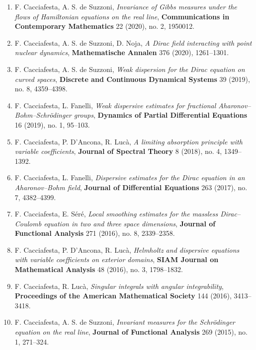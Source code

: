 \documentclass[10pt,a4paper]{article}
\newcommand{\venue}[1]{\textbf{#1}}
\newcommand{\FC}{{F. Cacciafesta}}
\begin{document}
\begin{enumerate}[label=\arabic*.,wide=0pt]
\item \FC, A. S. de Suzzoni, \emph{Invariance of Gibbs measures under the flows of Hamiltonian equations on the real line}, \venue{Communications in Contemporary Mathematics} 22 (2020), no. 2, 1950012.

\item \FC, A. S. de Suzzoni, D. Noja, \emph{A Dirac field interacting with point nuclear dynamics}, \venue{Mathematische Annalen} 376 (2020), 1261--1301.

\item \FC, A. S. de Suzzoni, \emph{Weak dispersion for the Dirac equation on curved spaces}, \venue{Discrete and Continuous Dynamical Systems} 39 (2019), no. 8, 4359--4398.

\item \FC, L. Fanelli, \emph{Weak dispersive estimates for fractional Aharonov--Bohm--Schr\"odinger groups}, \venue{Dynamics of Partial Differential Equations} 16 (2019), no. 1, 95--103.

\item \FC, P. D'Ancona, R. Luc\`a, \emph{A limiting absorption principle with variable coefficients}, \venue{Journal of Spectral Theory} 8 (2018), no. 4, 1349--1392.

\item \FC, L. Fanelli, \emph{Dispersive estimates for the Dirac equation in an Aharonov--Bohm field}, \venue{Journal of Differential Equations} 263 (2017), no. 7, 4382--4399.

\item \FC, E. S\'er\'e, \emph{Local smoothing estimates for the massless Dirac--Coulomb equation in two and three space dimensions}, \venue{Journal of Functional Analysis} 271 (2016), no. 8, 2339--2358.

\item \FC, P. D'Ancona, R. Luc\`a, \emph{Helmholtz and dispersive equations with variable coefficients on exterior domains}, \venue{SIAM Journal on Mathematical Analysis} 48 (2016), no. 3, 1798--1832.

\item \FC, R. Luc\`a, \emph{Singular integrals with angular integrability}, \venue{Proceedings of the American Mathematical Society} 144 (2016), 3413--3418.

\item \FC, A. S. de Suzzoni, \emph{Invariant measures for the Schr\"odinger equation on the real line}, \venue{Journal of Functional Analysis} 269 (2015), no. 1, 271--324.


\end{enumerate}
\end{document}
